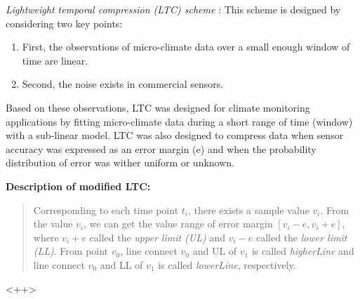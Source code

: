 \emph{\textcolor[rgb]{1,0,0}{Lightweight temporal compression (LTC) scheme}} \cite{Schoellhammer2004}: This scheme is designed by considering two key points:
\begin{enumerate}
    \item First, the observations of micro-climate data over a small enough window of time are linear. 
    \item Second, the noise exists in commercial sensors.
\end{enumerate}
Based on these observations, LTC was designed for climate monitoring applications by \textcolor[rgb]{1,0,0}{fitting micro-climate data during a short range of time (window) with a sub-linear model}. LTC was also designed to compress data when \textcolor[rgb]{1,0,0}{sensor accuracy was expressed as an error margin (e)} and when the \textcolor[rgb]{1,0,0}{probability distribution of error was wither uniform or unknown}. 

\textbf{Description of modified LTC:}

\begin{quote}
    Corresponding to each time point $t_i$, there exists a sample value $v_i$. From the value $v_i$, we can get the value range of error margin $\left[v_i-e, v_i+e\right]$, where $v_i+e$ called the \emph{upper limit (UL)} and $v_i-e$ called the \emph{lower limit (LL)}. From point $v_0$, line connect $v_0$ and UL of $v_1$ is called \emph{\textcolor[rgb]{1,0,0}{higherLine}} and line connect $v_0$ and LL of $v_1$ is called \emph{\textcolor[rgb]{1,0,0}{lowerLine}}, respectively. 
\end{quote}<++>




